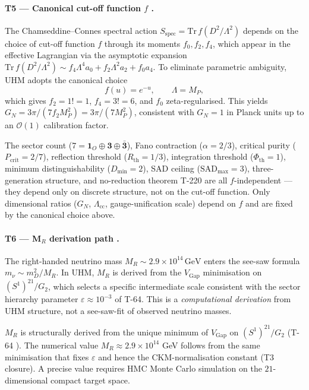 \paragraph{T5 --- Canonical cut-off function $f$ .}
The Chamseddine--Connes spectral action
$S_{\mathrm{spec}} = \mathrm{Tr}\, f(D^2/\Lambda^2)$ depends on the choice of
cut-off function $f$ through its moments $f_0, f_2, f_4$, which appear in the
effective Lagrangian via the asymptotic expansion
$\mathrm{Tr}\, f(D^2/\Lambda^2) \sim f_4 \Lambda^4 a_0 + f_2 \Lambda^2 a_2 + f_0 a_4$.
To eliminate parametric ambiguity, UHM adopts the canonical choice
\[
\boxed{f(u) = e^{-u}, \qquad \Lambda = M_P,}
\]
which gives $f_2 = 1! = 1$, $f_4 = 3! = 6$, and $f_0$ zeta-regularised. This
yields $G_N = 3\pi/(7 f_2 M_P^2) = 3\pi/(7 M_P^2)$, consistent with $G_N = 1$
in Planck units up to an $\mathcal O(1)$ calibration factor.

\begin{closurebox}
The sector count ($7 = \mathbf 1_O \oplus \mathbf 3 \oplus \bar{\mathbf 3}$),
Fano contraction ($\alpha = 2/3$), critical purity ($P_{\mathrm{crit}} = 2/7$),
reflection threshold ($R_{\mathrm{th}} = 1/3$), integration threshold
($\Phi_{\mathrm{th}} = 1$), minimum distinguishability ($D_{\min} = 2$), SAD
ceiling ($\mathrm{SAD}_{\max} = 3$), three-generation structure, and no-reduction
theorem T-220 are all $f$-independent --- they depend only on discrete structure,
not on the cut-off function. Only dimensional ratios ($G_N$, $\Lambda_{\mathrm{cc}}$,
gauge-unification scale) depend on $f$ and are fixed by the canonical choice above.
\end{closurebox}

\paragraph{T6 --- M$_R$ derivation path .}
The right-handed neutrino mass $M_R \sim 2.9 \times 10^{14}\,\mathrm{GeV}$
enters the see-saw formula $m_\nu \sim m_D^2 / M_R$. In UHM, $M_R$ is derived
from the $V_{\mathrm{Gap}}$ minimisation on $(S^1)^{21}/G_2$, which selects a
specific intermediate scale consistent with the sector hierarchy parameter
$\varepsilon \approx 10^{-3}$ of T-64. This is a \emph{computational derivation}
from UHM structure, not a see-saw-fit of observed neutrino masses.

\begin{closurebox}
$M_R$ is structurally derived from the unique minimum of $V_{\mathrm{Gap}}$ on
$(S^1)^{21}/G_2$ (T-64 ). The numerical value $M_R \approx
2.9 \times 10^{14}$ GeV follows from the same minimisation that fixes $\varepsilon$
and hence the CKM-normalisation constant (T3 closure). A precise value requires
HMC Monte Carlo simulation on the $21$-dimensional compact target space.
\end{closurebox}

